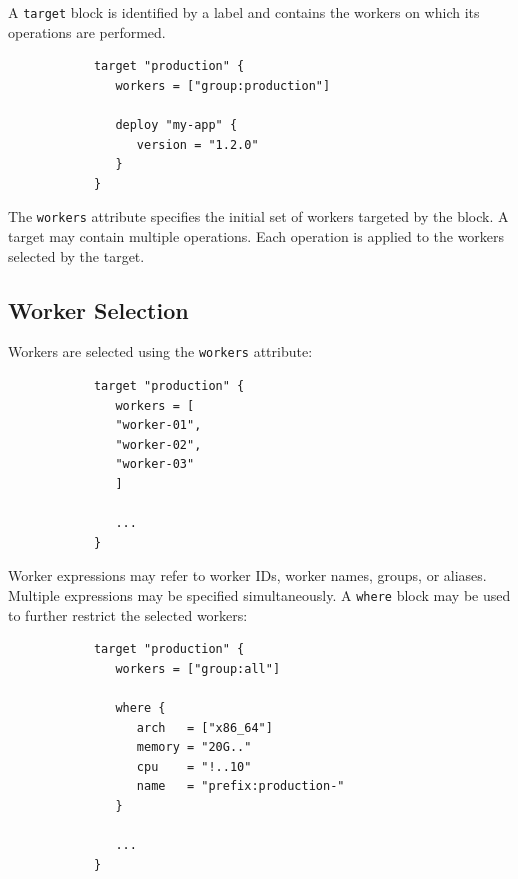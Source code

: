 \documentclass[11pt,a4paper]{article}
\begin{document}
    A \texttt{target} block is identified by a label and contains the workers on which its operations are performed.

    \begin{center}
        \begin{verbatim}
            target "production" {
               workers = ["group:production"]

               deploy "my-app" {
                  version = "1.2.0"
               }
            }
        \end{verbatim}
    \end{center}

    The \texttt{workers} attribute specifies the initial set of workers targeted by the block.
    A target may contain multiple operations.
    Each operation is applied to the workers selected by the target.

    \subsection{Worker Selection}\label{subsec:worker-selection}

    Workers are selected using the \texttt{workers} attribute:

    \begin{center}
        \begin{verbatim}
            target "production" {
               workers = [
               "worker-01",
               "worker-02",
               "worker-03"
               ]

               ...
            }
        \end{verbatim}
    \end{center}

    Worker expressions may refer to worker IDs, worker names, groups, or aliases.
    Multiple expressions may be specified simultaneously.
    A \texttt{where} block may be used to further restrict the selected workers:

    \begin{center}
        \begin{verbatim}
            target "production" {
               workers = ["group:all"]

               where {
                  arch   = ["x86_64"]
                  memory = "20G.."
                  cpu    = "!..10"
                  name   = "prefix:production-"
               }

               ...
            }
        \end{verbatim}
    \end{center}
\end{document}

